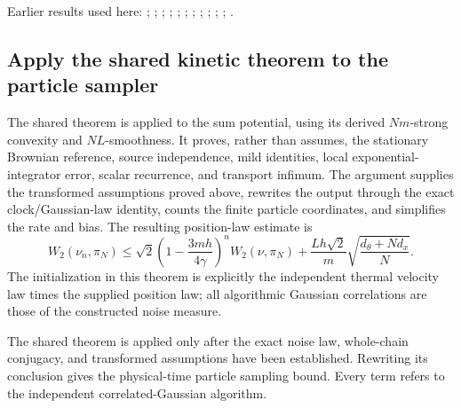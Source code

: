 \documentclass[11pt,a4paper]{report}
\begin{document}
Earlier results used here: \cite[Section~3.17.1]{LangevinLean2026ULASC}; \cite[Section~3.17.3]{LangevinLean2026ULASC}; \cite[Section~3.21.2]{LangevinLean2026ULASC}; \cite[Section~3.26.15]{LangevinLean2026ULASC}; \cite[Section~3.26.3]{LangevinLean2026ULASC}; \cite[Section~3.1.1]{LangevinLean2026IPLA}; \cite[Section~3.1.3]{LangevinLean2026IPLA}; \cite[Section~3.1.4]{LangevinLean2026IPLA}; \cite[Section~3.3.2]{LangevinLean2026IPLA}; \cite[Section~3.5.1]{LangevinLean2026IPLA}; \cite[Section~3.57.17]{LangevinLean2026Kinetic}; \cite[Section~3.57.18]{LangevinLean2026Kinetic}.
\subsection{\texorpdfstring{Apply the shared kinetic theorem to the particle sampler}{Apply the shared kinetic theorem to the particle sampler}}
\label{report-step-KIPLMC-CanonicalExponential-lean-4}


The shared theorem is applied to the sum potential, using its derived \(Nm\)-strong convexity and \(NL\)-smoothness. It proves, rather than assumes, the stationary Brownian reference, source independence, mild identities, local exponential-integrator error, scalar recurrence, and transport infimum. The argument supplies the transformed assumptions proved above, rewrites the output through the exact clock/\allowbreak{}Gaussian-law identity, counts the finite particle coordinates, and simplifies the rate and bias. The resulting position-law estimate is \[W_2(\nu_n,\pi_N)\le\sqrt2\left(1-\frac{3mh}{4\gamma}\right)^nW_2(\nu,\pi_N)+\frac{Lh\sqrt2}{m}\sqrt{\frac{d_\theta+Nd_x}{N}}.\] The initialization in this theorem is explicitly the independent thermal velocity law times the supplied position law; all algorithmic Gaussian correlations are those of the constructed noise measure.



The shared theorem is applied only after the exact noise law, whole-chain conjugacy, and transformed assumptions have been established. Rewriting its conclusion gives the physical-time particle sampling bound. Every term refers to the independent correlated-Gaussian algorithm.
\end{document}
